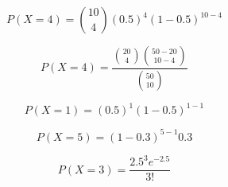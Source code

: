 \documentclass{standalone}
\newcommand{\binomialformula}[3]{
    P(X = #2) = \binom{#1}{#2} (#3)^{#2} (1-#3)^{#1-#2}
}
\newcommand{\hipergeometricaformula}[4]{
    P(X = #4) = \frac{\binom{#2}{#4} \binom{#1-#2}{#3-#4}}{\binom{#1}{#3}}
}
\newcommand{\bernoulliformula}[2]{
    P(X = #2) = (#1)^{#2} (1-#1)^{1-#2}
}
\newcommand{\geometricaformula}[2]{
    P(X = #2) = (1-#1)^{#2-1} #1
}
\newcommand{\poissonformula}[2]{
    P(X = #2) = \frac{#1^{#2} e^{-#1}}{#2!}
}
\begin{document}
\[\binomialformula{10}{4}{0.5}\]

\[\hipergeometricaformula{50}{20}{10}{4}\]

\[\bernoulliformula{0.5}{1}\]

\[\geometricaformula{0.3}{5}\]

\[\poissonformula{2.5}{3}\]
\end{document}

